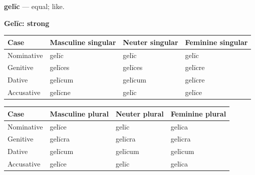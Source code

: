 \par\begin{minipage}{\linewidth}\raggedright
\textbf{gelīc} — equal; like.

\textbf{Gelīc: strong}

\par\begingroup
\fontsize{10.5}{13.2}\selectfont
\setlength{\LTleft}{0pt}\setlength{\LTright}{\fill}
\noindent
\begin{tabular}{@{}>{\raggedright\arraybackslash}p{22.0mm}>{\raggedright\arraybackslash}p{31.188mm}>{\raggedright\arraybackslash}p{31.188mm}>{\raggedright\arraybackslash}p{31.188mm}@{}}
\toprule
\textbf{Case} & \textbf{Masculine singular} & \textbf{Neuter singular} & \textbf{Feminine singular} \\
\midrule
Nominative & gelīc & gelīc & gelīc \\
Genitive & gelīces & gelīces & gelīcre \\
Dative & gelīcum & gelīcum & gelīcre \\
Accusative & gelīcne & gelīc & gelīce \\
\bottomrule
\end{tabular}
\par\endgroup
\par\addvspace{5pt}
\par\begingroup
\fontsize{10.5}{13.2}\selectfont
\setlength{\LTleft}{0pt}\setlength{\LTright}{\fill}
\noindent
\begin{tabular}{@{}>{\raggedright\arraybackslash}p{22.0mm}>{\raggedright\arraybackslash}p{31.188mm}>{\raggedright\arraybackslash}p{31.188mm}>{\raggedright\arraybackslash}p{31.188mm}@{}}
\toprule
\textbf{Case} & \textbf{Masculine plural} & \textbf{Neuter plural} & \textbf{Feminine plural} \\
\midrule
Nominative & gelīce & gelīc & gelīca \\
Genitive & gelīcra & gelīcra & gelīcra \\
Dative & gelīcum & gelīcum & gelīcum \\
Accusative & gelīce & gelīc & gelīca \\
\bottomrule
\end{tabular}
\par\endgroup
\end{minipage}\par\addvspace{4pt}

